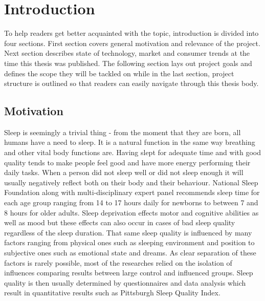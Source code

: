 \chapter{Introduction}
\label{chap:introduction}

To help readers get better acquainted with the topic, introduction is divided into four sections. First section covers general motivation and relevance of the project. Next section describes state of technology, market and consumer trends at the time this thesis was published. The following section lays out project goals and defines the scope they will be tackled on while in the last section, project structure is outlined so that readers can easily navigate through this thesis body.


\section{Motivation}

Sleep is seemingly a trivial thing - from the moment that they are born, all humans have a need to sleep. It is a natural function in the same way breathing and other vital body functions are. Having slept for adequate time and with good quality tends to make people feel good and have more energy performing their daily tasks. When a person did not sleep well or did not sleep enough it will usually negatively reflect both on their body and their behaviour. National Sleep Foundation along with multi-disciplinary expert panel recommends sleep time for each age group ranging from 14 to 17 hours daily for newborns to between 7 and 8 hours for older adults\cite{NSF}. Sleep deprivation effects motor and cognitive abilities as well as mood but these effects can also occur in cases of bad sleep quality regardless of the sleep duration\cite{doi:10.1093/sleep/19.4.318}. That same sleep quality is influenced by many factors ranging from physical ones such as sleeping environment and position to subjective ones such as emotional state and dreams. As clear separation of these factors is rarely possible, most of the researches relied on the isolation of influences comparing results between large control and influenced groups. Sleep quality is then usually determined by questionnaires and data analysis which result in quantitative results such as Pittsburgh Sleep Quality Index\cite{psqi}.\\


